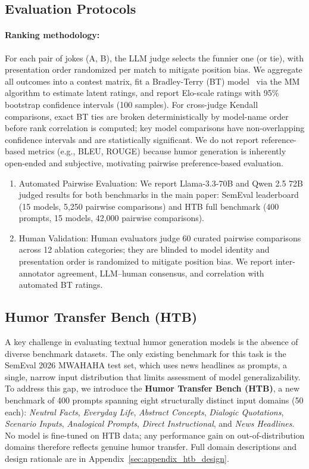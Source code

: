 \documentclass[11pt]{article}
\begin{document}
\subsection{Evaluation Protocols}

\paragraph{Ranking methodology:} 
For each pair of jokes (A, B), the LLM judge selects the funnier one (or tie), with presentation order randomized per match to mitigate position bias. We aggregate all outcomes into a contest matrix, fit a Bradley-Terry (BT) model~\cite{gao2025re,ajayi2026humorrank} via the MM algorithm to estimate latent ratings, and report Elo-scale ratings with 95\% bootstrap confidence intervals (100 samples). For cross-judge Kendall comparisons, exact BT ties are broken deterministically by model-name order before rank correlation is computed; key model comparisons have non-overlapping confidence intervals and are statistically significant. We do not report reference-based metrics (e.g., BLEU, ROUGE) because humor generation is inherently open-ended and subjective, motivating pairwise preference-based evaluation.

\begin{enumerate}
    \item Automated Pairwise Evaluation: We report Llama-3.3-70B and Qwen 2.5 72B judged results for both benchmarks in the main paper: SemEval leaderboard (15 models, 5,250 pairwise comparisons) and HTB full benchmark (400 prompts, 15 models, 42,000 pairwise comparisons).
    \item Human Validation: Human evaluators judge 60 curated pairwise comparisons across 12 ablation categories; they are blinded to model identity and presentation order is randomized to mitigate position bias. We report inter-annotator agreement, LLM--human consensus, and correlation with automated BT ratings.
\end{enumerate}

\subsection{Humor Transfer Bench (HTB)}
A key challenge in evaluating textual humor generation models is the absence of diverse benchmark datasets. The only existing benchmark for this task is the SemEval 2026 MWAHAHA test set, which uses news headlines as prompts, a single, narrow input distribution that limits assessment of model generalizability. To address this gap, we introduce the \textbf{Humor Transfer Bench (HTB)}, a new benchmark of 400 prompts spanning eight structurally distinct input domains (50 each): \textit{Neutral Facts}, \textit{Everyday Life}, \textit{Abstract Concepts}, \textit{Dialogic Quotations}, \textit{Scenario Inputs}, \textit{Analogical Prompts}, \textit{Direct Instructional}, and \textit{News Headlines}. No model is fine-tuned on HTB data; any performance gain on out-of-distribution domains therefore reflects genuine humor transfer. Full domain descriptions and design rationale are in Appendix~\ref{sec:appendix_htb_design}.
\end{document}
